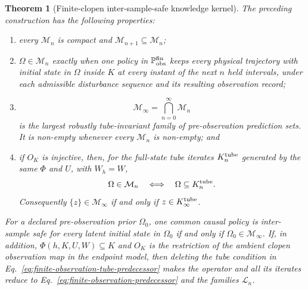 \documentclass[11pt]{article}
\newtheorem{theorem}{Theorem}
\theoremstyle{definition}
\begin{document}
\begin{theorem}[Finite-clopen inter-sample-safe knowledge kernel]
\label{thm:finite-observation-tube-viability}
The preceding construction has the following properties:
\begin{enumerate}
\item every $\mathcal M_n$ is compact and
$\mathcal M_{n+1}\subseteq\mathcal M_n$;
\item $\Omega\in\mathcal M_n$ exactly when one policy in
$\mathbb P_{\rm obs}^{\rm fin}$ keeps every physical trajectory with initial
state in $\Omega$ inside $K$ at every instant of the next $n$ held intervals,
under each admissible disturbance sequence and its resulting observation
record;
\item
\begin{equation}
\mathcal M_\infty=\bigcap_{n=0}^{\infty}\mathcal M_n
\label{eq:finite-observation-tube-kernel}
\end{equation}
is the largest robustly tube-invariant family of pre-observation prediction
sets.  It is non-empty whenever every $\mathcal M_n$ is non-empty; and
\item if $O_K$ is injective, then, for the full-state tube iterates
$K_n^{\rm tube}$ generated by the same $\Phi$ and $U$, with $W_h=W$,
\[
\Omega\in\mathcal M_n
\quad\Longleftrightarrow\quad
\Omega\subseteq K_n^{\rm tube}.
\]
Consequently $\{z\}\in\mathcal M_\infty$ if and only if
$z\in K_\infty^{\rm tube}$.
\end{enumerate}
For a declared pre-observation prior $\Omega_0$, one common causal policy is
inter-sample safe for every latent initial state in $\Omega_0$ if and only if
$\Omega_0\in\mathcal M_\infty$.  If, in addition, $\Phi(h,K,U,W)\subseteq K$ and $O_K$ is the restriction of
the ambient clopen observation map in the endpoint model, then deleting the
tube condition in Eq.~\eqref{eq:finite-observation-tube-predecessor} makes
the operator and all its iterates reduce to
Eq.~\eqref{eq:finite-observation-predecessor} and the families
$\mathcal L_n$.
\end{theorem}
\end{document}
